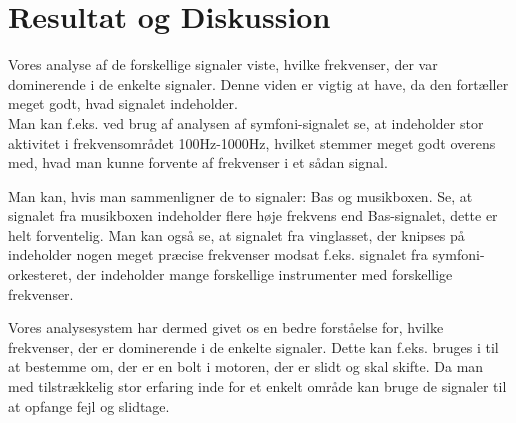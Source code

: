 \chapter{Resultat og Diskussion}\label{ch:Resultat og Diskussion}

Vores analyse af de forskellige signaler viste, hvilke frekvenser, der var dominerende i de enkelte signaler. Denne viden er vigtig at have, da den fortæller meget godt, hvad signalet indeholder. \\Man kan f.eks. ved brug af analysen af symfoni-signalet se, at indeholder stor aktivitet i frekvensområdet 100Hz-1000Hz, hvilket stemmer meget godt overens med, hvad man kunne forvente af frekvenser i et sådan signal.

Man kan, hvis man sammenligner de to signaler: Bas og musikboxen. Se, at signalet fra musikboxen indeholder flere høje frekvens end Bas-signalet, dette er helt forventelig. Man kan også se, at signalet fra vinglasset, der knipses på indeholder nogen meget præcise frekvenser modsat f.eks. signalet fra symfoni-orkesteret, der indeholder mange forskellige instrumenter med forskellige frekvenser.

Vores analysesystem har dermed givet os en bedre forståelse for, hvilke frekvenser, der er dominerende i de enkelte signaler. Dette kan f.eks. bruges i til at bestemme om, der er en bolt i motoren, der er slidt og skal skifte. Da man med tilstrækkelig stor erfaring inde for et enkelt område kan bruge de signaler til at opfange fejl og slidtage.
